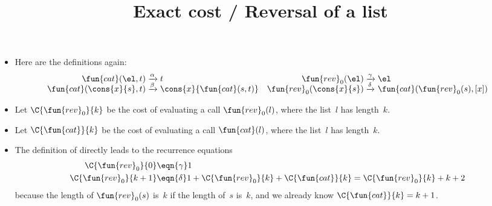 \documentclass[wide]{slides}
\begin{document}
\begin{slide}
  \title{Exact cost / Reversal of a list}

  \begin{itemize}

    \item Here are the definitions again:
      \begin{equation*}
        \begin{array}{@{}r@{\;}l@{\;}lr@{\;}l@{\;}l@{}}
          \fun{cat}(\el,t)
          & \xrightarrow{\alpha} & t
          & \fun{rev}_0(\el)
          & \xrightarrow{\smash{\gamma}} & \el\\
          \fun{cat}(\cons{x}{s},t)
          & \xrightarrow{\smash{\beta}} & \cons{x}{\fun{cat}(s,t)}
          & \fun{rev}_0(\cons{x}{s})
          & \xrightarrow{\smash{\delta}} & \fun{cat}(\fun{rev}_0(s),[x])
        \end{array}
      \end{equation*}

    \item Let \(\C{\fun{rev}_0}{k}\) be the cost of evaluating a call
      \(\fun{rev}_0(l)\), where the list~\(l\) has length~\(k\).

    \item Let \(\C{\fun{cat}}{k}\) be the cost of evaluating a call
      \(\fun{cat}(l)\), where the list~\(l\) has length~\(k\).

    \item The definition of  directly leads to the
      recurrence equations
      \begin{align*}
        \C{\fun{rev}_0}{0}   & \eqn{\gamma} 1\\
        \C{\fun{rev}_0}{k+1} & \eqn{\smash{\delta}} 1 +
        \C{\fun{rev}_0}{k} + \C{\fun{cat}}{k} = \C{\fun{rev}_0}{k} + k
        + 2
      \end{align*}
      because the length of \(\fun{rev}_0(s)\) is~\(k\) if the length
      of~\(s\) is~\(k\), and we already know \(\C{\fun{cat}}{k} = k +
      1\).

  \end{itemize}

\end{slide}
\end{document}
